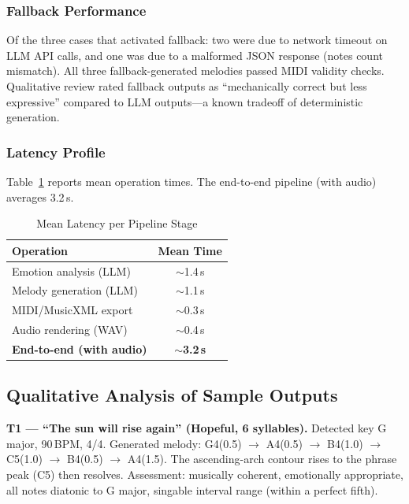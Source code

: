 \documentclass[conference]{IEEEtran}
\begin{document}
\subsubsection{Fallback Performance}

Of the three cases that activated fallback: two were due to network timeout on
LLM API calls, and one was due to a malformed JSON response (notes count
mismatch). All three fallback-generated melodies passed MIDI validity checks.
Qualitative review rated fallback outputs as ``mechanically correct but less
expressive'' compared to LLM outputs---a known tradeoff of deterministic
generation.

\subsubsection{Latency Profile}

Table~\ref{tab:latency} reports mean operation times. The end-to-end pipeline
(with audio) averages 3.2\,s.

\begin{table}[htbp]
\caption{Mean Latency per Pipeline Stage}
\label{tab:latency}
\centering
\begin{tabular}{@{}lc@{}}
\toprule
\textbf{Operation} & \textbf{Mean Time} \\
\midrule
Emotion analysis (LLM)  & $\sim$1.4\,s \\
Melody generation (LLM) & $\sim$1.1\,s \\
MIDI/MusicXML export    & $\sim$0.3\,s \\
Audio rendering (WAV)   & $\sim$0.4\,s \\
\textbf{End-to-end (with audio)} & \textbf{$\sim$3.2\,s} \\
\bottomrule
\end{tabular}
\end{table}

\subsection{Qualitative Analysis of Sample Outputs}

\textbf{T1 --- ``The sun will rise again'' (Hopeful, 6 syllables).}
Detected key G major, 90\,BPM, 4/4. Generated melody:
G4(0.5) $\to$ A4(0.5) $\to$ B4(1.0) $\to$ C5(1.0) $\to$ B4(0.5) $\to$
A4(1.5). The ascending-arch contour rises to the phrase peak (C5) then
resolves. Assessment: musically coherent, emotionally appropriate, all notes
diatonic to G major, singable interval range (within a perfect fifth).
\end{document}
